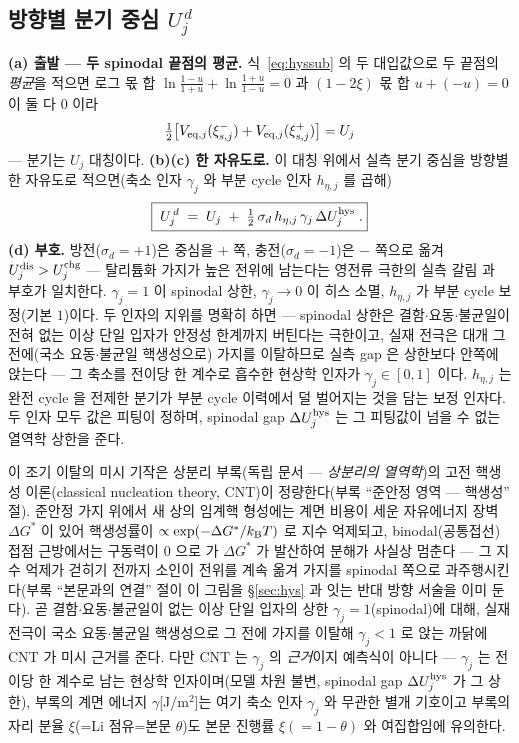 \subsection{방향별 분기 중심 $U_j^{\,d}$}\label{sec:hys-branch}
\textbf{(a) 출발 --- 두 spinodal 끝점의 평균.} 식~\eqref{eq:hyssub} 의 두 대입값으로 두 끝점의 \emph{평균}을 적으면
로그 몫 합 $\ln\frac{1-u}{1+u}+\ln\frac{1+u}{1-u}=0$ 과 $(1-2\xi)$ 몫 합 $u+(-u)=0$ 이 둘 다 $0$ 이라
\begin{equation}
\tfrac12\big[V_{\mathrm{eq},j}(\xi_{s,j}^-)+V_{\mathrm{eq},j}(\xi_{s,j}^+)\big]=U_j
\label{eq:hyssym}
\end{equation}
--- 분기는 $U_j$ 대칭이다. \textbf{(b)(c) 한 자유도로.} 이 대칭 위에서 실측 분기 중심을 방향별 한 자유도로 적으면(축소
인자 $\gamma_j$ 와 부분 cycle 인자 $h_{\eta,j}$ 를 곱해)
\begin{equation}
\boxed{\;U_j^{\,d}\;=\;U_j\;+\;\tfrac12\,\sigma_d\,h_{\eta,j}\,\gamma_j\,\Delta U_j^{\mathrm{hys}}\;.}
\label{eq:Ubranch}
\end{equation}
\textbf{(d) 부호.} 방전($\sigma_d=+1$)은 중심을
$+$ 쪽, 충전($\sigma_d=-1$)은 $-$ 쪽으로 옮겨 $U_j^{\mathrm{dis}}>U_j^{\mathrm{chg}}$ --- 탈리튬화 가지가 높은 전위에
남는다는 영전류 극한의 실측 갈림\cite{dreyer2010} 과 부호가 일치한다.
$\gamma_j=1$ 이 spinodal 상한, $\gamma_j\to0$ 이 히스 소멸, $h_{\eta,j}$ 가 부분 cycle 보정(기본 $1$)이다.
두 인자의 지위를 명확히 하면 --- spinodal 상한은 결함$\cdot$요동$\cdot$불균일이 전혀 없는 이상 단일 입자가
안정성 한계까지 버틴다는 극한이고, 실재 전극은 대개 그 전에(국소 요동$\cdot$불균일 핵생성으로) 가지를
이탈하므로 실측 gap 은 상한보다 안쪽에 앉는다 --- 그 축소를 전이당 한 계수로 흡수한 현상학 인자가
$\gamma_j\in[0,1]$ 이다. $h_{\eta,j}$ 는 완전 cycle 을 전제한 분기가 부분 cycle 이력에서 덜 벌어지는 것을
담는 보정 인자다. 두 인자 모두 값은 피팅이 정하며, spinodal gap $\Delta U_j^{\mathrm{hys}}$ 는 그 피팅값이 넘을 수
없는 열역학 상한을 준다.

이 조기 이탈의 미시 기작은 상분리 부록(독립 문서 --- \emph{상분리의 열역학})의 고전 핵생성
이론(classical nucleation theory, CNT)이 정량한다(부록 ``준안정 영역 --- 핵생성'' 절). 준안정
가지 위에서 새 상의 임계핵 형성에는 계면 비용이 세운 자유에너지 장벽 $\Delta G^\ast$ 이 있어
핵생성률이 $\propto\exp(-\Delta G^\ast/k_{\mathrm B} T)$ 로 지수 억제되고, binodal(공통접선) 접점 근방에서는
구동력이 $0$ 으로 가 $\Delta G^\ast$ 가 발산하여 분해가 사실상 멈춘다 --- 그 지수 억제가 걷히기
전까지 소인이 전위를 계속 옮겨 가지를 spinodal 쪽으로 과주행시킨다(부록 ``본문과의 연결'' 절이 이
그림을 \S\ref{sec:hys} 과 잇는 반대 방향 서술을 이미 둔다). 곧 결함$\cdot$요동$\cdot$불균일이 없는
이상 단일 입자의 상한 $\gamma_j=1$(spinodal)에 대해, 실재 전극이 국소 요동$\cdot$불균일 핵생성으로
그 전에 가지를 이탈해 $\gamma_j<1$ 로 앉는 까닭에 CNT 가 미시 근거를 준다. 다만 CNT 는 $\gamma_j$ 의
\emph{근거}이지 예측식이 아니다 --- $\gamma_j$ 는 전이당 한 계수로 남는 현상학 인자이며(모델 차원
불변, spinodal gap $\Delta U_j^{\mathrm{hys}}$ 가 그 상한), 부록의 계면 에너지 $\gamma$[J/m$^2$]는 여기 축소
인자 $\gamma_j$ 와 무관한 별개 기호이고 부록의 자리 분율 $\xi$(=Li 점유=본문 $\theta$)도 본문 진행률
$\xi(=1-\theta)$ 와 여집합임에 유의한다.

